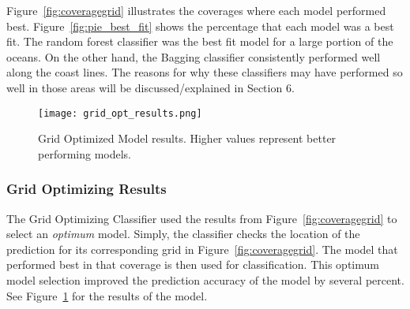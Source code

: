 \par
Figure~\ref{fig:coveragegrid} illustrates the coverages where each model performed best.
Figure~\ref{fig:pie_best_fit} shows the percentage that each model was a best fit.
The random forest classifier was the best fit model for a large portion of the oceans.
On the other hand, the Bagging classifier consistently performed well along the coast lines.
The reasons for why these classifiers may have performed so well in those areas will be discussed/explained in Section 6.


\begin{figure}[htp]
    \centering
    \texttt{[image: grid\_opt\_results.png]}
    \caption{Grid Optimized Model results. Higher values represent better performing models.}
    \label{fig:grid_opt_barplot}
\end{figure}
\subsubsection{Grid Optimizing Results}
The Grid Optimizing Classifier used the results from Figure~\ref{fig:coveragegrid} to select an \textit{optimum} model.
Simply, the classifier checks the location of the prediction for its corresponding grid in Figure~\ref{fig:coveragegrid}.
The model that performed best in that coverage is then used for classification.
This optimum model selection improved the prediction accuracy of the model by several percent.
See Figure~\ref{fig:grid_opt_barplot} for the results of the model.


